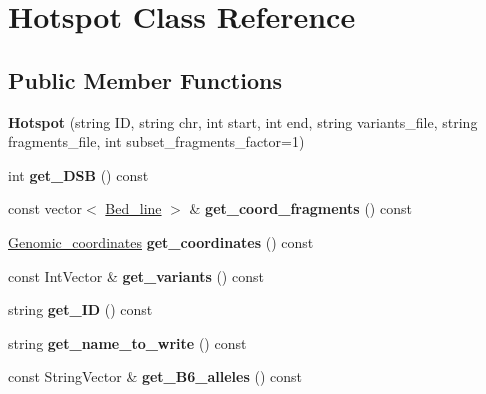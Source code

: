 \hypertarget{class_hotspot}{}\section{Hotspot Class Reference}
\label{class_hotspot}
\subsection*{Public Member Functions}
\begin{DoxyCompactItemize}
\item 
\mbox{\label{class_hotspot_a34eac4b8bd3273feea0de74f1ca17cf5}} 
{\bfseries Hotspot} (string ID, string chr, int start, int end, string variants\+\_\+file, string fragments\+\_\+file, int subset\+\_\+fragments\+\_\+factor=1)
\item 
\mbox{\label{class_hotspot_abb22df75679422cb7ba9840d5a291db3}} 
int {\bfseries get\+\_\+\+D\+SB} () const
\item 
\mbox{\label{class_hotspot_adee28c2c36a5a3ebec9146694170a8ea}} 
const vector$<$ \mbox{\hyperlink{struct_bed__line}{Bed\+\_\+line}} $>$ \& {\bfseries get\+\_\+coord\+\_\+fragments} () const
\item 
\mbox{\label{class_hotspot_a525cc4b3004090ff348fa126f10630c9}} 
\mbox{\hyperlink{struct_genomic__coordinates}{Genomic\+\_\+coordinates}} {\bfseries get\+\_\+coordinates} () const
\item 
\mbox{\label{class_hotspot_aa2b90586a2e66acf7faeb70e15c72f45}} 
const Int\+Vector \& {\bfseries get\+\_\+variants} () const
\item 
\mbox{\label{class_hotspot_a123e0b631e0901dd7b2d78a0ffe4c04f}} 
string {\bfseries get\+\_\+\+ID} () const
\item 
\mbox{\label{class_hotspot_acb44999a2ceddf2a7431d7c4493743a5}} 
string {\bfseries get\+\_\+name\+\_\+to\+\_\+write} () const
\item 
\mbox{\label{class_hotspot_abb4bf2ae6bce98d6dfa1997bbceebe33}} 
const String\+Vector \& {\bfseries get\+\_\+\+B6\+\_\+alleles} () const
\item 

\end{DoxyCompactItemize}
